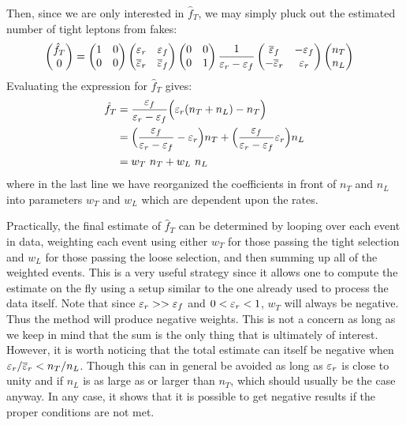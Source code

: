 Then,  since we are only interested in $\hat{f}_T$, 
we may simply pluck out the estimated number of tight leptons
from fakes:
\begin{align}
  \label{eq:mxm_final_single2}
  \begin{pmatrix} \hat{f}_T \\ 0 \end{pmatrix} 
  &=
  \begin{pmatrix}
  1 & 0\\ 0 & 0
  \end{pmatrix} 
  \begin{pmatrix}
  \varepsilon_r & \varepsilon_f \\ \overline{\varepsilon}_r & \overline{\varepsilon}_f
  \end{pmatrix} 
  \begin{pmatrix}
  0 & 0\\ 0 & 1
  \end{pmatrix} 
  \frac{1}{\varepsilon_r-\varepsilon_f}
  \begin{pmatrix}
  \overline{\varepsilon}_f & -\varepsilon_f \\ -\overline{\varepsilon}_r& \varepsilon_r
  \end{pmatrix} 
  \begin{pmatrix} n_T\\ n_L \end{pmatrix}
\end{align}
Evaluating the expression for $\hat{f}_T$ gives:
\begin{align}
\hat{f}_T &= \frac{\varepsilon_f}{\varepsilon_r-\varepsilon_f} \Big( \varepsilon_r(n_T+n_L) - n_T \Big)  \\
           &= \Big( \frac{\varepsilon_f}{\varepsilon_r-\varepsilon_f} 
	      -\varepsilon_r\Big) n_T 
	      + \Big(\frac{\varepsilon_f}{\varepsilon_r-\varepsilon_f} \varepsilon_r \Big)n_L\\
           &= w_T~n_T + w_L~n_L
\end{align}
where in the last line we have reorganized the coefficients in front
of $n_T$ and $n_L$ into parameters $w_T$ and $w_L$ which are dependent
upon the rates. 

Practically, the final estimate of $\hat{f}_T$
can be determined by looping over each event in data, weighting each event
using either $w_T$ for those passing the tight selection and
$w_L$ for those passing the loose selection, and then 
summing up all of the weighted events.  This is a very useful 
strategy since it allows one to compute the estimate on the fly
using a setup similar to the one already used to process the data itself. %
Note that since $\varepsilon_r>>\varepsilon_f$ and $0<\varepsilon_r<1$,
$w_T$ will always be negative. Thus the method will produce negative weights.
This is not a concern as long as we keep in mind that the sum
is the only thing that is ultimately of interest.
However, it is worth noticing that the total estimate can itself
be negative when 
$\varepsilon_r / \overline{\varepsilon}_r < n_T/n_L$.
Though this can in general be avoided as long as $\varepsilon_r$
is close to unity and if $n_L$ is
as large as or larger than $n_T$, which should usually be the case
anyway. In any case, it shows that it is possible to get negative
results if the proper conditions are not met.

